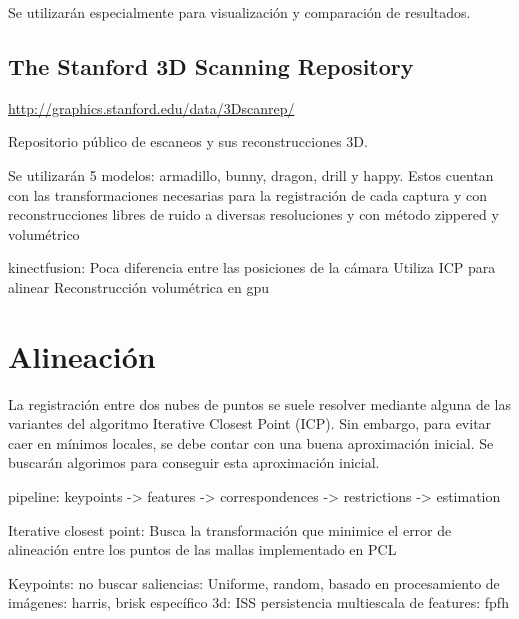 \documentclass{pfc}
\begin{document}
			Se utilizarán especialmente para visualización
			y comparación de resultados.

		\subsection{The Stanford 3D Scanning Repository}
			\url{http://graphics.stanford.edu/data/3Dscanrep/}

			Repositorio público de escaneos y sus reconstrucciones 3D.

			Se utilizarán 5 modelos: armadillo, bunny, dragon, drill y happy.
			Estos cuentan con las transformaciones necesarias para la
			registración de cada captura y con reconstrucciones libres de ruido
			a diversas resoluciones y con método zippered %
			y volumétrico

		kinectfusion:
			Poca diferencia entre las posiciones de la cámara
			Utiliza ICP para alinear
			Reconstrucción volumétrica en gpu

	\section{Alineación}
		La registración entre dos nubes de puntos se suele resolver mediante
		alguna de las variantes del algoritmo Iterative Closest Point (ICP).
		Sin embargo, para evitar caer en mínimos locales,
		se debe contar con una buena aproximación inicial.
		Se buscarán algorimos para conseguir esta aproximación inicial.

			pipeline: keypoints -> features -> correspondences -> restrictions -> estimation


		Iterative closest point:
			Busca la transformación que minimice el error de alineación
			entre los puntos de las mallas
			implementado en PCL

		Keypoints:
			no buscar saliencias: Uniforme, random,
			basado en procesamiento de imágenes: harris, brisk
			específico 3d: ISS
			persistencia multiescala de features: fpfh
\end{document}
